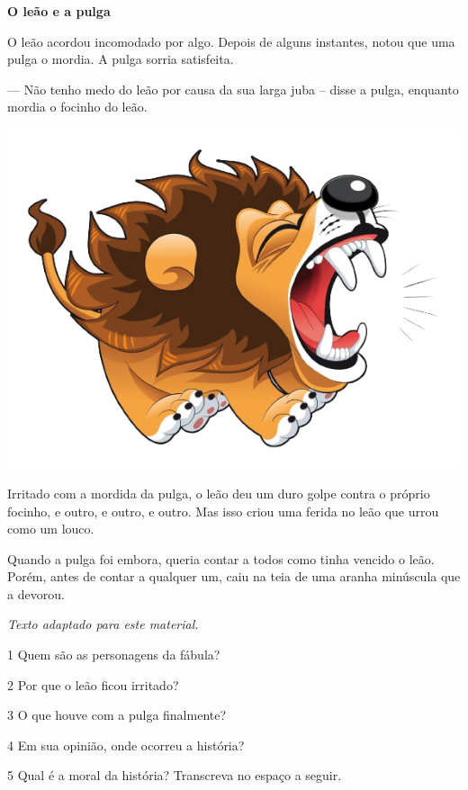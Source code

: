 \begin{myquote}
\textbf{O leão e a pulga}

O leão acordou incomodado por algo. Depois de alguns instantes, notou que uma pulga o mordia. A pulga sorria satisfeita. 

--- Não tenho medo do leão por causa da sua larga juba -- disse a pulga, enquanto mordia o focinho do leão.  

\begin{center}
\noindent\includegraphics[width=.5\textwidth]{./media/image1b.png}
\end{center}

Irritado com a mordida da pulga, o leão deu um duro golpe contra o próprio focinho, e outro, e outro, e outro. Mas isso criou uma ferida no leão que urrou como um louco.

Quando a pulga foi embora, queria contar a todos como tinha vencido o leão. Porém, antes de contar a qualquer um, caiu na teia de uma aranha minúscula que a devorou.

\emph{Texto adaptado para este material.}
\end{myquote}

\num{1} Quem são as personagens da fábula?


\num{2} Por que o leão ficou irritado?


\num{3} O que houve com a pulga finalmente?


\num{4} Em sua opinião, onde ocorreu a história?


\num{5} Qual é a moral da história? Transcreva no espaço a seguir.

